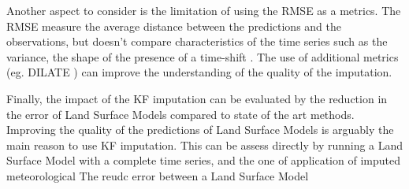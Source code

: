 \documentclass{article}
\begin{document}
Another aspect to consider is the limitation of using the RMSE as a metrics. The RMSE measure the average distance between the predictions and the observations, but doesn't compare characteristics of the time series such as the variance, the shape of the presence of a time-shift \cite{guen_shape_nodate}. The use of additional metrics (eg. DILATE \cite{guen_shape_nodate}) can improve the understanding of the quality of the imputation.

Finally, the impact of the KF imputation can be evaluated by the reduction in the error of Land Surface Models compared to state of the art methods. Improving the quality of the predictions of Land Surface Models is arguably the main reason to use KF imputation. This can be assess directly by running a Land Surface Model with a complete time series, and the one of application of imputed meteorological     The reudc error between a Land Surface Model 




\end{document}
